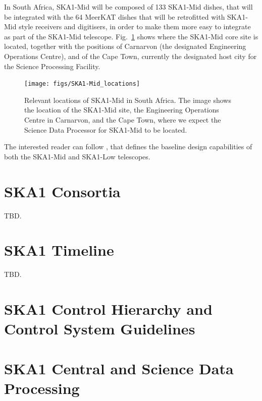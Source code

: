 \documentclass[a4paper,
               biblatex,       %
               keeplastbox,    %
               ]{jacow-2_1}    %
\begin{document}
In South Africa, SKA1-Mid will be composed of 133 SKA1-Mid dishes, that will be integrated with the 64 MeerKAT dishes that will be retrofitted with SKA1-Mid style receivers and digitisers, in order to make them more easy to integrate as part of the SKA1-Mid telescope.
Fig.~\ref{fig:figs_SKA1-Mid_locations} shows where the SKA1-Mid core site is located, together with the positions of Carnarvon (the designated Engineering Operations Centre), and of the Cape Town, currently the designated host city for the Science Processing Facility.

\begin{figure}[!htb]
  \centering
    \texttt{[image: figs/SKA1-Mid\_locations]}
  \caption{Relevant locations of SKA1-Mid in South Africa. The image shows the location of the SKA1-Mid site,  the Engineering Operations Centre in Carnarvon, and the Cape Town, where we expect the Science Data Processor for SKA1-Mid to be located.}
  \label{fig:figs_SKA1-Mid_locations}
\end{figure}

The interested reader can follow \cite{SKA-TEL-SKO-0000002_v3}, that defines the baseline design capabilities of both the SKA1-Mid and SKA1-Low telescopes.



\section{SKA1 Consortia} %
\label{sec:ska1_consortia}
TBD.


\section{SKA1 Timeline} %
\label{sec:ska1_timeline}
TBD.
 

\section{SKA1 Control Hierarchy and Control System Guidelines} %
\label{sec:ska1_control_hierarchy_and_control_system_guidelines}


\section{SKA1 Central and Science Data Processing} %
\label{sec:ska1_central_and_science_data_processing}
\end{document}
